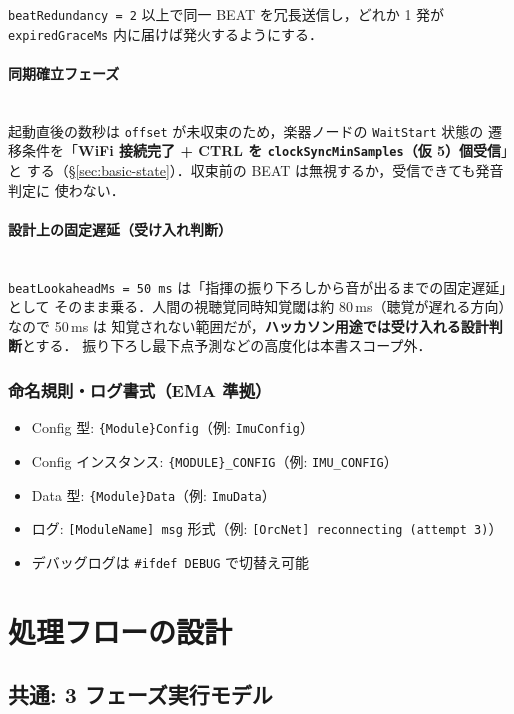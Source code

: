 \documentclass[lualatex,book,paper=a4paper,jafontsize=11.5pt,jafontscale=1.05]{jlreq}
\begin{document}
\texttt{beatRedundancy = 2} 以上で同一 BEAT を冗長送信し，どれか 1 発が
\texttt{expiredGraceMs} 内に届けば発火するようにする．

\paragraph{同期確立フェーズ}\mbox{}\\
起動直後の数秒は \texttt{offset} が未収束のため，楽器ノードの \texttt{WaitStart} 状態の
遷移条件を「\textbf{WiFi 接続完了 + CTRL を \texttt{clockSyncMinSamples}（仮 5）個受信}」と
する（\S\ref{sec:basic-state}）．収束前の BEAT は無視するか，受信できても発音判定に
使わない．

\paragraph{設計上の固定遅延（受け入れ判断）}\mbox{}\\
\texttt{beatLookaheadMs = 50\,ms} は「指揮の振り下ろしから音が出るまでの固定遅延」として
そのまま乗る．人間の視聴覚同時知覚閾は約 80\,ms（聴覚が遅れる方向）なので 50\,ms は
知覚されない範囲だが，\textbf{ハッカソン用途では受け入れる設計判断}とする．
振り下ろし最下点予測などの高度化は本書スコープ外．

\subsubsection{命名規則・ログ書式（EMA 準拠）}

\begin{itemize}
  \item Config 型: \texttt{\{Module\}Config}（例: \texttt{ImuConfig}）
  \item Config インスタンス: \texttt{\{MODULE\}\_CONFIG}（例: \texttt{IMU\_CONFIG}）
  \item Data 型: \texttt{\{Module\}Data}（例: \texttt{ImuData}）
  \item ログ: \texttt{[ModuleName] msg} 形式（例: \texttt{[OrcNet] reconnecting (attempt 3)}）
  \item デバッグログは \texttt{\#ifdef DEBUG} で切替え可能
\end{itemize}


\section{処理フローの設計}\label{sec:proc-flow}

\subsection{共通: 3 フェーズ実行モデル}
\end{document}
